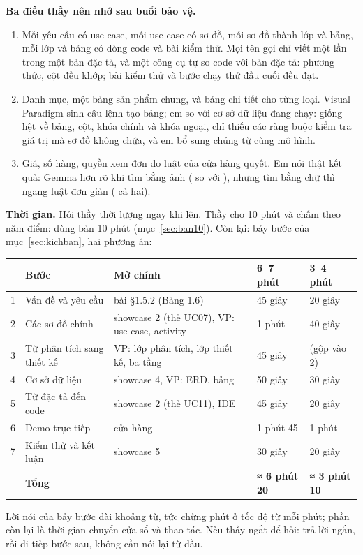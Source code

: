 \textbf{Ba điều thầy nên nhớ sau buổi bảo vệ.}
\begin{enumerate}[leftmargin=1.5em]
\item {} Mỗi yêu cầu có use case, mỗi use case có sơ đồ, mỗi sơ đồ thành lớp và bảng, mỗi lớp và bảng có dòng code và bài kiểm thử. Mọi tên gọi chỉ viết một lần trong một bản đặc tả, và một công cụ tự so code với bản đặc tả: \factCheckOps{} phương thức, \factCheckColumns{} cột đều khớp; \factTests{} bài kiểm thử và \factEtoE{} bước chạy thử đầu cuối đều đạt.
\item {} Danh mục, một bảng sản phẩm chung, và bảng chi tiết cho từng loại. Visual Paradigm sinh câu lệnh tạo bảng; em so với cơ sở dữ liệu đang chạy: giống hệt về bảng, cột, khóa chính và khóa ngoại, chỉ thiếu các ràng buộc kiểm tra giá trị mà sơ đồ không chứa, và em bổ sung chúng từ cùng mô hình.
\item {} Giá, số hàng, quyền xem đơn do luật của cửa hàng quyết. Em nói thật kết quả: Gemma hơn rõ khi tìm bằng ảnh (\evImageGemma{} so với \evImageLocal{}), nhưng tìm bằng chữ thì ngang luật đơn giản (\evTextDirectGemma{} cả hai).
\end{enumerate}

\textbf{Thời gian.} Hỏi thầy thời lượng ngay khi lên. Thầy cho 10 phút và chấm theo năm điểm: dùng bản 10 phút (mục~\ref{sec:ban10}). Còn lại: bảy bước của mục~\ref{sec:kichban}, hai phương án:
\begin{center}\small
\begin{tabular}{@{}P{0.5cm}P{4.6cm}P{6.1cm}P{1.9cm}P{1.9cm}@{}}
\toprule
& \textbf{Bước} & \textbf{Mở chính} & \textbf{6--7 phút} & \textbf{3--4 phút}\\
 & Vấn đề và yêu cầu & bài §1.5.2 (Bảng 1.6) & 45 giây & 20 giây\\
2 & Các sơ đồ chính & showcase 2 (thẻ UC07), VP: use case, activity & 1 phút & 40 giây\\
3 & Từ phân tích sang thiết kế & VP: lớp phân tích, lớp thiết kế, ba tầng & 45 giây & (gộp vào 2)\\
4 & Cơ sở dữ liệu & showcase 4, VP: ERD, bảng  & 50 giây & 30 giây\\
5 & Từ đặc tả đến code & showcase 2 (thẻ UC11), IDE & 45 giây & 20 giây\\
6 & Demo trực tiếp & cửa hàng & 1 phút 45 & 1 phút\\
7 & Kiểm thử và kết luận & showcase 5 & 30 giây & 20 giây\\
\midrule
& \textbf{Tổng} & & \textbf{≈ 6 phút 20} & \textbf{≈ 3 phút 10}\\
\bottomrule
\end{tabular}
\end{center}
Lời nói của bảy bước dài khoảng \scriptWords{} từ, tức chừng \timeSpeech{} phút ở tốc độ \wpm{} từ mỗi phút; phần còn lại là thời gian chuyển cửa sổ và thao tác. Nếu thầy ngắt để hỏi: trả lời ngắn, rồi đi tiếp bước sau, không cần nói lại từ đầu.
\newpage
